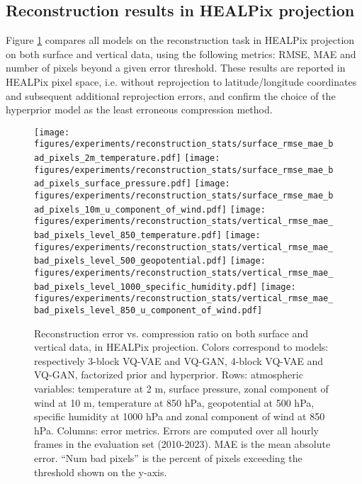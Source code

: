 \subsection{Reconstruction results in HEALPix projection}

Figure \ref{fig:error_vs_cr} compares all models on the reconstruction task in HEALPix projection on both surface and vertical data, using the following metrics: RMSE, MAE and number of pixels beyond a given error threshold. These results are reported in HEALPix pixel space, i.e. without reprojection to latitude/longitude coordinates and subsequent additional reprojection errors, and confirm the choice of the hyperprior model as the least erroneous compression method.

\begin{figure}
    \centering
    \texttt{[image: figures/experiments/reconstruction\_stats/surface\_rmse\_mae\_bad\_pixels\_2m\_temperature.pdf]}
    \texttt{[image: figures/experiments/reconstruction\_stats/surface\_rmse\_mae\_bad\_pixels\_surface\_pressure.pdf]}
    \texttt{[image: figures/experiments/reconstruction\_stats/surface\_rmse\_mae\_bad\_pixels\_10m\_u\_component\_of\_wind.pdf]}
    \texttt{[image: figures/experiments/reconstruction\_stats/vertical\_rmse\_mae\_bad\_pixels\_level\_850\_temperature.pdf]}
    \texttt{[image: figures/experiments/reconstruction\_stats/vertical\_rmse\_mae\_bad\_pixels\_level\_500\_geopotential.pdf]}
    \texttt{[image: figures/experiments/reconstruction\_stats/vertical\_rmse\_mae\_bad\_pixels\_level\_1000\_specific\_humidity.pdf]}
    \texttt{[image: figures/experiments/reconstruction\_stats/vertical\_rmse\_mae\_bad\_pixels\_level\_850\_u\_component\_of\_wind.pdf]}
    \hfill
    \caption{Reconstruction error vs. compression ratio on both surface and vertical data, in HEALPix projection. Colors correspond to models: respectively 3-block VQ-VAE and VQ-GAN, 4-block VQ-VAE and VQ-GAN, factorized prior and hyperprior. Rows: atmospheric variables: temperature at 2 m, surface pressure, zonal component of wind at 10 m, temperature at 850 hPa, geopotential at 500 hPa, specific humidity at 1000 hPa and zonal component of wind at 850 hPa. Columns: error metrics. Errors are computed over all hourly frames in the evaluation set (2010-2023). MAE is the mean absolute error. ``Num bad pixels'' is the percent of pixels exceeding the threshold shown on the y-axis.}
    \label{fig:error_vs_cr}
\end{figure}

